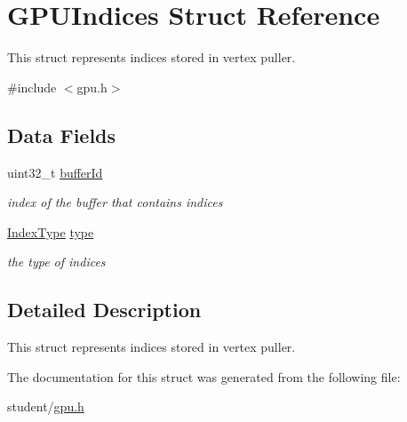 \hypertarget{structGPUIndices}{}\section{G\+P\+U\+Indices Struct Reference}
\label{structGPUIndices}


This struct represents indices stored in vertex puller.  




{\ttfamily \#include $<$gpu.\+h$>$}

\subsection*{Data Fields}
\begin{DoxyCompactItemize}
\item 
\mbox{\label{structGPUIndices_a0f61fc90e8a9152f7df0b063cce268cf}} 
uint32\+\_\+t \hyperlink{structGPUIndices_a0f61fc90e8a9152f7df0b063cce268cf}{buffer\+Id}
\begin{DoxyCompactList}\small\item\em index of the buffer that contains indices \end{DoxyCompactList}\item 
\mbox{\label{structGPUIndices_aab36cd5f0fb486ff3b6e91e89006f3b4}} 
\hyperlink{gpu_8h_a2bfb0a0ff1c379a8b4e8f9d24fdd4839}{Index\+Type} \hyperlink{structGPUIndices_aab36cd5f0fb486ff3b6e91e89006f3b4}{type}
\begin{DoxyCompactList}\small\item\em the type of indices \end{DoxyCompactList}\end{DoxyCompactItemize}


\subsection{Detailed Description}
This struct represents indices stored in vertex puller. 

The documentation for this struct was generated from the following file\+:\begin{DoxyCompactItemize}
\item 
student/\hyperlink{gpu_8h}{gpu.\+h}\end{DoxyCompactItemize}
